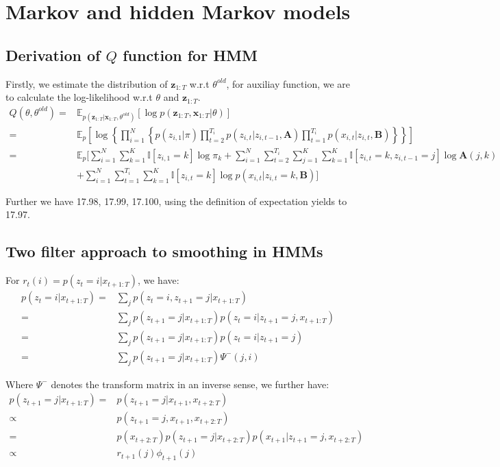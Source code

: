 \documentclass[UTF8]{ctexart}
\begin{document}
\newpage
\section{Markov and hidden Markov models}
\subsection{Derivation of $Q$ function for HMM}
Firstly, we estimate the distribution of $\textbf{z}_{1:T}$ w.r.t $\theta^{old}$, for auxiliay function, we are to calculate the log-likelihood w.r.t $\theta$ and $\textbf{z}_{1:T}$.
\begin{align}
Q(\theta,\theta^{old})=&\mathbb{E}_{p(\textbf{z}_{1:T}|\textbf{x}_{1:T},\theta^{old})}[\log p(\textbf{z}_{1:T},\textbf{x}_{1:T}|\theta)] \nonumber \\
=&\mathbb{E}_{p}[\log \left\{ \prod_{i=1}^{N} \left\{p(z_{i,1}|\pi)\prod_{t=2}^{T_{i}}p(z_{i,t}|z_{i,t-1},\textbf{A})\prod_{t=1}^{T_{i}}p(x_{i,t}|z_{i,t},\textbf{B})\right\}\right\}] \nonumber \\
=&\mathbb{E}_{p}[\sum_{i=1}^{N}\sum_{k=1}^{K}\mathbb{I}[z_{i,1}=k]\log \pi_{k}+\sum_{i=1}^{N}\sum_{t=2}^{T_{i}}\sum_{j=1}^{K}\sum_{k=1}^{K}\mathbb{I}[z_{i,t}=k,z_{i,t-1}=j]\log \textbf{A}(j,k)\nonumber \\
\ &+\sum_{i=1}^{N}\sum_{t=1}^{T_{i}}\sum_{k=1}^{K}\mathbb{I}[z_{i,t}=k]\log p(x_{i,t}|z_{i,t}=k,\textbf{B}) ] \nonumber
\end{align}

Further we have 17.98, 17.99, 17.100, using the definition of expectation yields to 17.97.

\subsection{Two filter approach to smoothing in HMMs}
For $r_{t}(i)=p(z_{t}=i|x_{t+1:T})$, we have:
\begin{align}
p(z_{t}=i|x_{t+1:T})=&\sum_{j}p(z_{t}=i,z_{t+1}=j|x_{t+1:T}) \nonumber \\
=&\sum_{j}p(z_{t+1}=j|x_{t+1:T})p(z_{t}=i|z_{t+1}=j,x_{t+1:T}) \nonumber \\
=&\sum_{j}p(z_{t+1}=j|x_{t+1:T})p(z_{t}=i|z_{t+1}=j) \nonumber \\
=&\sum_{j}p(z_{t+1}=j|x_{t+1:T})\Psi^{-}(j,i) \nonumber
\end{align}

Where $\Psi^{-}$ denotes the transform matrix in an inverse sense, we further have:
\begin{align}
p(z_{t+1}=j|x_{t+1:T})=&p(z_{t+1}=j|x_{t+1},x_{t+2:T}) \nonumber \\
\propto&p(z_{t+1}=j,x_{t+1},x_{t+2:T}) \nonumber \\
=&p(x_{t+2:T})p(z_{t+1}=j|x_{t+2:T})p(x_{t+1}|z_{t+1}=j,x_{t+2:T}) \nonumber \\
\propto& r_{t+1}(j)\phi_{t+1}(j) \nonumber
\end{align}
\end{document}
